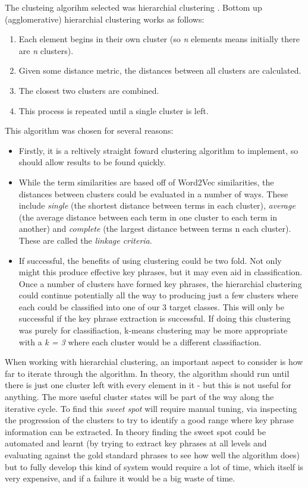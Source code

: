 The clusteing algorihm selected was hierarchial clustering \cite{Rai2010}. Bottom up (agglomerative) hierarchial clustering works as follows:
\begin{enumerate}
	\item Each element begins in their own cluster (so \textit{n} elements means initially there are \textit{n} clusters).
	\item Given some distance metric, the distances between all clusters are calculated.
	\item The closest two clusters are combined.
	\item This process is repeated until a single cluster is left.
\end{enumerate}
\noindent This algorithm was chosen for several reasons:
\begin{itemize}
	\item Firstly, it is a reltively straight foward clustering algorithm to implement, so should allow results to be found quickly.
	\item While the term similarities are based off of Word2Vec similarities, the distances between clusters could be evaluated in a number of ways. These include \textit{single} (the shortest distance between terms in each cluster), \textit{average} (the average distance between each term in one cluster to each term in another) and \textit{complete} (the largest distance between terms n each cluster). These are called the \textit{linkage criteria}.
	\item If successful, the benefits of using clustering could be two fold. Not only might this produce effective key phrases, but it may even aid in classification. Once a number of clusters have formed key phrases, the hierarchial clustering could continue potentially all the way to producing just a few clusters where each could be classified into one of our 3 target classes. This will only be successful if the key phrase extraction is successful. If doing this clustering was purely for classifiaction, k-means clustering may be more appropriate with a \textit{k = 3} where each cluster would be a different classifiaction.
\end{itemize}

When working with hierarchial clustering, an important aspect to consider is how far to iterate through the algorithm. In theory, the algorithm should run until there is just one cluster left with every element in it - but this is not useful for anything. The more useful cluster states will be part of the way along the iterative cycle. To find this \textit{sweet spot} will require manual tuning, via inspecting the progression of the clusters to try to identify a good range where key phrase information can be extracted. In theory finding the sweet spot could be automated and learnt (by trying to extract key phrases at all levels and evaluating against the gold standard phrases to see how well the algorithm does) but to fully develop this kind of system would require a lot of time, which itself is very expensive, and if a failure it would be a big waste of time.

